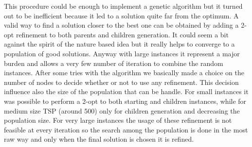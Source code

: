 This procedure could be enough to implement a genetic algorithm but it turned
out to be inefficient because it led to a solution quite far from the optimum. A
valid way to find a solution closer to the best one can be obtained by adding a
2-opt refinement to both parents and children generation. It could seem a bit
against the spirit of the nature based idea but it really helps to converge to a
population of good solutions. Anyway with large instances it represent a major
burden and allows a very few number of iteration to combine the random
instances. After some tries with the algorithm we basically made a choice on the
number of nodes to decide whether or not to use any refinement. This decision
influence also the size of the population that can be handle. For small
instances it was possible to perform a 2-opt to both starting and children
instances, while for medium size TSP (around 500) only for children generation
and decreasing the population size. For very large instances the usage of these
refinement is not feasible at every iteration so the search among the population
is done in the most raw way and only when the final solution is chosen it is
refined.



